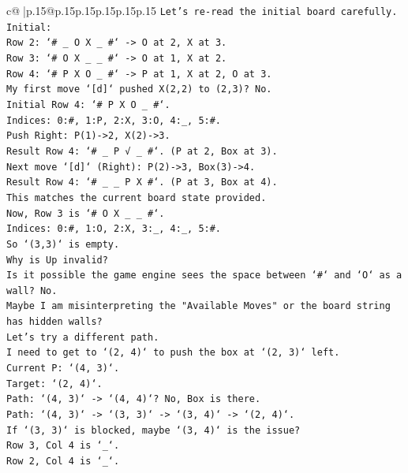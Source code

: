 \documentclass{article}
\begin{document}
{\begin{supertabular}{c@{$\;$}|p{.15\linewidth}@{}p{.15\linewidth}p{.15\linewidth}p{.15\linewidth}p{.15\linewidth}p{.15\linewidth}}
{{{\texttt{Let's re{-}read the initial board carefully.} \\
\texttt{Initial:} \\
\texttt{Row 2: `\# \_ O X \_ \#` {-}> O at 2, X at 3.} \\
\texttt{Row 3: `\# O X \_ \_ \#` {-}> O at 1, X at 2.} \\
\texttt{Row 4: `\# P X O \_ \#` {-}> P at 1, X at 2, O at 3.} \\
\texttt{My first move `{[}d{]}` pushed X(2,2) to (2,3)? No.} \\
\texttt{Initial Row 4: `\# P X O \_ \#`.} \\
\texttt{Indices: 0:\#, 1:P, 2:X, 3:O, 4:\_, 5:\#.} \\
\texttt{Push Right: P(1){-}>2, X(2){-}>3.} \\
\texttt{Result Row 4: `\# \_ P √ \_ \#`. (P at 2, Box at 3).} \\
\texttt{Next move `{[}d{]}` (Right): P(2){-}>3, Box(3){-}>4.} \\
\texttt{Result Row 4: `\# \_ \_ P X \#`. (P at 3, Box at 4).} \\
\texttt{This matches the current board state provided.} \\
\texttt{Now, Row 3 is `\# O X \_ \_ \#`.} \\
\texttt{Indices: 0:\#, 1:O, 2:X, 3:\_, 4:\_, 5:\#.} \\
\texttt{So `(3,3)` is empty.} \\
\texttt{Why is Up invalid?} \\
\texttt{Is it possible the game engine sees the space between `\#` and `O` as a wall? No.} \\
\texttt{Maybe I am misinterpreting the "Available Moves" or the board string has hidden walls?} \\
\texttt{Let's try a different path.} \\
\texttt{I need to get to `(2, 4)` to push the box at `(2, 3)` left.} \\
\texttt{Current P: `(4, 3)`.} \\
\texttt{Target: `(2, 4)`.} \\
\texttt{Path: `(4, 3)` {-}> `(4, 4)`? No, Box is there.} \\
\texttt{Path: `(4, 3)` {-}> `(3, 3)` {-}> `(3, 4)` {-}> `(2, 4)`.} \\
\texttt{If `(3, 3)` is blocked, maybe `(3, 4)` is the issue?} \\
\texttt{Row 3, Col 4 is `\_`.} \\
\texttt{Row 2, Col 4 is `\_`.} \\
}}}
\end{supertabular}}
\end{document}
